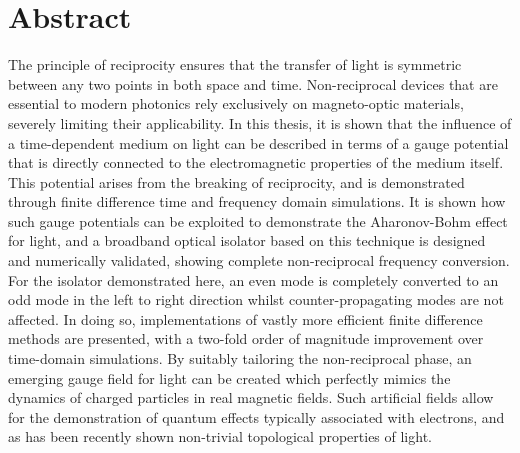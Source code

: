 \chapter*{Abstract}

The principle of reciprocity ensures that the transfer of light is symmetric between any two points in both space and time. Non-reciprocal devices that are essential to modern photonics rely exclusively on magneto-optic materials, severely limiting their applicability. In this thesis, it is shown that the influence of a time-dependent medium on light can be described in terms of a gauge potential that is directly connected to the electromagnetic properties of the medium itself. This potential arises from the breaking of reciprocity, and is demonstrated through finite difference time and frequency domain simulations. It is shown how such gauge potentials can be exploited to demonstrate the Aharonov-Bohm effect for light, and a broadband optical isolator based on this technique is designed and numerically validated, showing complete non-reciprocal frequency conversion. For the isolator demonstrated here, an even mode is completely converted to an odd mode in the left to right direction whilst counter-propagating modes are not affected. In doing so, implementations of vastly more efficient finite difference methods are presented, with a two-fold order of magnitude improvement over time-domain simulations. By suitably tailoring the non-reciprocal phase, an emerging gauge field for light can be created which perfectly mimics the dynamics of charged particles in real magnetic fields. Such artificial fields allow for the demonstration of quantum effects typically associated with electrons, and as has been recently shown non-trivial topological properties of light.



